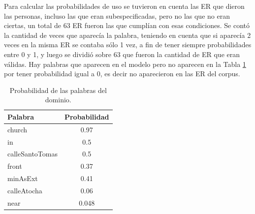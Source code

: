 Para calcular las probabilidades de uso se tuvieron en cuenta las ER que dieron las personas, incluso las que eran subespecificadas, pero no las que no eran ciertas, un total de 63 ER fueron las que cumpl\'ian con esas condiciones. Se cont\'o la cantidad de veces que aparec\'ia la palabra, teniendo en cuenta que si aparec\'ia 2 veces en la misma ER se contaba s\'olo 1 vez, a fin de tener siempre probabilidades entre 0 y 1, y luego se dividi\'o sobre 63 que fueron la cantidad de ER que eran v\'alidas. Hay palabras que aparecen en el modelo pero no aparecen en la Tabla \ref{prob-vocabulario} por tener probabilidad igual a 0, es decir no aparecieron en las ER del corpus. 
\begin{table}[H]
\begin{small}
\begin{center}
\begin{tabular}{|l|c|}
\hline
Palabra 					      &  Probabilidad\\ \hline \hline
church & 0.97\\
in & 0.5\\
calleSantoTomas & 0.5\\
front & 0.37\\
minAsExt & 0.41\\
calleAtocha & 0.06\\
near & 0.048\\

\hline
\end{tabular}
\caption{Probabilidad de las palabras del dominio.}\label{prob-vocabulario}
\end{center}
\end{small}
\end{table}
%

